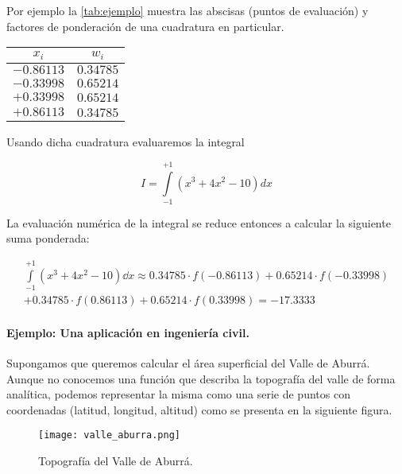 Por ejemplo la \cref{tab:ejemplo} muestra las abscisas (puntos de evaluación) y factores de ponderación de una cuadratura en particular. 

\begin{center}
	\begin{tabular}{cc}
		\hline
		$x_i$ & $w_i$ \\
		\hline
		$-0.86113$  & $0.34785$  \\
		$-0.33998$  & $0.65214$  \\
		$ +0.33998$  & $0.65214$  \\
		$ +0.86113$  & $0.34785$  \\
		\hline
	\end{tabular}
	\label{tab:ejemplo}
\end{center}

Usando dicha cuadratura evaluaremos la integral 

\[I = \int\limits_{ - 1}^{ + 1} {({x^3} + 4{x^2} - 10)dx}\]


La evaluación numérica de la integral se reduce entonces a calcular la siguiente suma ponderada:

\begin{align*}
\int\limits_{-1}^{+1} (x^3 + 4 x^2 - 10) \dd{x} \approx 0.34785 \cdot f(-0.86113) + 0.65214 \cdot f(-0.33998) \\
+ 0.34785 \cdot f(0.86113) + 0.65214 \cdot f(0.33998) = -17.3333
\end{align*}


\paragraph*{Ejemplo: Una aplicación en ingeniería civil.}
Supongamos que queremos calcular el área superficial del Valle de Aburrá. Aunque no conocemos una función que describa la topografía del valle de forma analítica, podemos representar la misma como una serie de puntos con coordenadas (latitud, longitud,  altitud) como se presenta en la siguiente figura.
\begin{figure}[H]
	\centering
	\texttt{[image: valle\_aburra.png]}
	\caption{Topografía del Valle de Aburrá.}
\end{figure}

